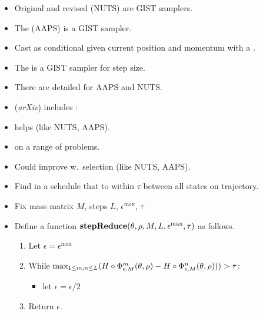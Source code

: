 \documentclass[10pt]{report}
\begin{document}
\begin{itemize}
\item Original and revised  (NUTS) are GIST samplers.
\item The  (AAPS) is a GIST sampler.
\item Cast as conditional  given
  current position and momentum with a .
\item The  is a GIST sampler for step size. 
\vfill
\item There are detailed  for AAPS and NUTS. 
\end{itemize}

\begin{itemize}
\item {} ({\slshape arXiv}) includes :
\item {} helps (like NUTS, AAPS).
\item {} on a range of problems.
\item Could improve w.\ selection  (like NUTS, AAPS).
\end{itemize}

\begin{itemize}
\item Find  in a schedule that  to within $\tau$ between all states on trajectory.
\item Fix mass matrix $M$, steps $L$, 
  $\epsilon^\text{max}$,  $\tau$
\item Define a function $\textrm{\bfseries stepReduce}(\theta, \rho, M, L, \epsilon^\text{max}, \tau)$ as follows.
\begin{enumerate}
  \item Let $\epsilon = \epsilon^\text{max}$
  \item While $\textrm{max}_{\normalsize 1 \leq m, n \leq L}(H \circ \Phi^m_{\epsilon, M}(\theta, \rho) - H \circ \Phi^n_{\epsilon,M}(\theta, \rho))) > \tau$:
    \begin{itemize}
    \item let $\epsilon = \epsilon / 2$
    \end{itemize}
  \item Return $\epsilon$.
\end{enumerate}
\end{itemize}
\end{document}
